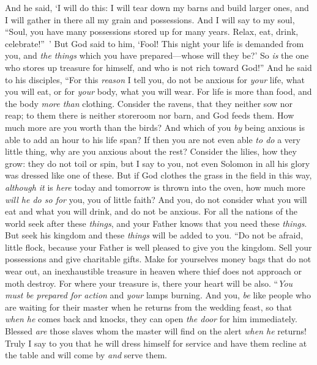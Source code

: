 \begin{biblechapter}
\verse And he said, ‘I will do this: I will tear down my barns and build larger ones, and I will gather in there all my grain and possessions.
\verse And I will say to my soul, “Soul, you have many possessions stored up for many years. Relax, eat, drink, celebrate!” ’
\verse But God said to him, ‘Fool! This night your life is demanded from you, and \textit{the things} which you have prepared—whose will they be?’
\verse So \textit{is} the one who stores up treasure for himself, and who is not rich toward God!”
 And he said to his disciples, “For this \textit{reason} I tell you, do not be anxious for \textit{your} life, what you will eat, or for \textit{your} body, what you will wear.
\verse For life is more than food, and the body \textit{more than} clothing.
\verse Consider the ravens, that they neither sow nor reap; to them there is neither storeroom nor barn, and God feeds them. How much more are you worth than the birds?
\verse And which of you \textit{by} being anxious is able to add an hour to his life span?
\verse If then you are not even able \textit{to do} a very little thing, why are you anxious about the rest?
\verse Consider the lilies, how they grow: they do not toil or spin, but I say to you, not even Solomon in all his glory was dressed like one of these.
\verse But if God clothes the grass in the field in this way, \textit{although it} is \textit{here} today and tomorrow is thrown into the oven, how much more \textit{will he do so for} you, you of little faith?
\verse And you, do not consider what you will eat and what you will drink, and do not be anxious.
\verse For all the nations of the world seek after these \textit{things}, and your Father knows that you need these \textit{things}.
\verse But seek his kingdom and these \textit{things} will be added to you.
\verse “Do not be afraid, little flock, because your Father is well pleased to give you the kingdom.
\verse Sell your possessions and give charitable gifts. Make for yourselves money bags that do not wear out, an inexhaustible treasure in heaven where thief does not approach or moth destroy.
\verse For where your treasure is, there your heart will be also.
 “\textit{You must be prepared for action} and \textit{your} lamps burning.
\verse And you, \textit{be} like people who are waiting for their master when he returns from the wedding feast, so that \textit{when he} comes back and knocks, they can open \textit{the door} for him immediately.
\verse Blessed \textit{are} those slaves whom the master will find on the alert \textit{when he} returns! Truly I say to you that he will dress himself for service and have them recline at the table and will come by \textit{and} serve them.

\end{biblechapter}
